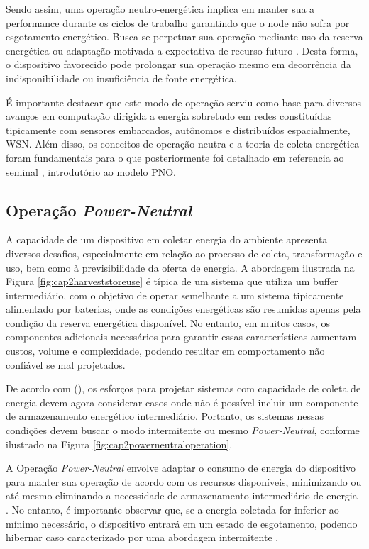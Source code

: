 Sendo assim, uma operação neutro-energética implica em manter sua a performance durante os ciclos de trabalho garantindo que o node não sofra por esgotamento energético. Busca-se perpetuar sua operação mediante uso da reserva energética ou adaptação motivada a expectativa de recurso futuro \cite{sudevalayam_energy_2011}. Desta forma, o dispositivo favorecido pode prolongar sua operação mesmo em decorrência da indisponibilidade ou insuficiência de fonte energética.

É importante destacar que este modo de operação serviu como base para diversos avanços em computação dirigida a energia sobretudo em redes constituídas tipicamente com sensores embarcados, autônomos e distribuídos espacialmente, \acf{WSN}. Além disso, os conceitos de operação-neutra e a teoria de coleta energética foram fundamentais para o que posteriormente foi detalhado em referencia ao seminal \cite{merrett_energy-driven_2017}, introdutório ao modelo \acf{PNO}.



\subsection{Operação \textit{Power-Neutral}}
A capacidade de um dispositivo em coletar energia do ambiente apresenta diversos desafios, especialmente em relação ao processo de coleta, transformação e uso, bem como à previsibilidade da oferta de energia. A abordagem ilustrada na Figura \ref{fig:cap2harveststoreuse} é típica de um sistema que utiliza um buffer intermediário, com o objetivo de operar semelhante a um sistema tipicamente alimentado por baterias, onde as condições energéticas são resumidas apenas pela condição da reserva energética disponível. No entanto, em muitos casos, os componentes adicionais necessários para garantir essas características aumentam custos, volume e complexidade, podendo resultar em comportamento não confiável se mal projetados.

De acordo com \citeauthor{merrett_energy-driven_2017}(\citeyear{merrett_energy-driven_2017}), os esforços para projetar sistemas com capacidade de coleta de energia devem agora considerar casos onde não é possível incluir um componente de armazenamento energético intermediário. Portanto, os sistemas nessas condições devem buscar o modo intermitente ou mesmo \textit{Power-Neutral}, conforme ilustrado na Figura \ref{fig:cap2powerneutraloperation}.

A Operação \textit{Power-Neutral} envolve adaptar o consumo de energia do dispositivo para manter sua operação de acordo com os recursos disponíveis, minimizando ou até mesmo eliminando a necessidade de armazenamento intermediário de energia \cite{sliper_energy-driven_2020}. No entanto, é importante observar que, se a energia coletada for inferior ao mínimo necessário, o dispositivo entrará em um estado de esgotamento, podendo hibernar caso caracterizado por uma abordagem intermitente \cite{merrett_energy-driven_2017}.



